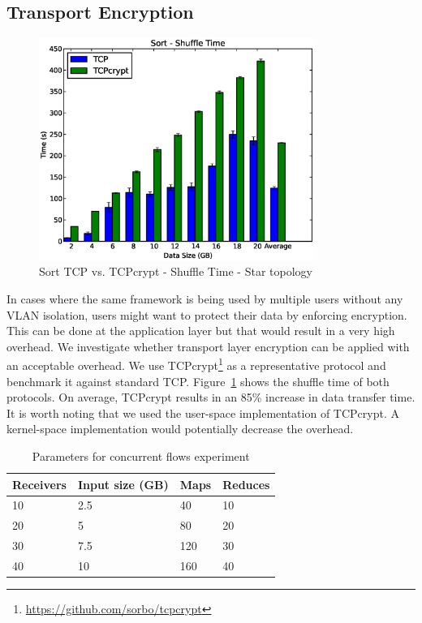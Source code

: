 \documentclass[a4paper,12pt,twoside,openright]{report}
\begin{document}
\subsection{Transport Encryption}
\begin{figure}[h!]
  \centering
    \includegraphics[width=0.8\textwidth]{shuffle_sort_tcpcrypt.eps}
    \caption{Sort TCP vs. TCPcrypt - Shuffle Time - Star topology}
    \label{chap:eval:sec:ciel:fig:sortshuffletcpcrypt}
\end{figure}
In cases where the same framework is being used by multiple users without any
VLAN isolation, users might want to protect their data by enforcing encryption.
This can be done at the application layer but that would result in a very high
overhead. We investigate whether transport layer encryption can be applied with
an acceptable overhead. We use
TCPcrypt\footnote{\url{https://github.com/sorbo/tcpcrypt}} as a representative
protocol and benchmark it against standard TCP.
Figure~\ref{chap:eval:sec:ciel:fig:sortshuffletcpcrypt} shows the shuffle time
of both protocols. On average, TCPcrypt results in an 85\% increase in data
transfer time. It is worth noting that we used the user-space implementation of
TCPcrypt. A kernel-space implementation would potentially decrease the overhead.

\begin{table}
  \centering
  \begin{tabular}{| l || l | l | l |}
    \hline
	\textbf{Receivers} & \textbf{Input size (GB)} & \textbf{Maps} &
	\textbf{Reduces}
	\\
	\hline
	10 & 2.5 & 40 & 10 \\ \hline
    20 & 5 & 80 & 20 \\ \hline
    30 & 7.5 & 120 & 30 \\ \hline
    40 & 10 & 160 & 40\\ \hline
    \hline
  \end{tabular}
  \caption{Parameters for concurrent flows experiment}
  \label{chap:eval:sec:ciel:tab:flows}
\end{table}
\end{document}
